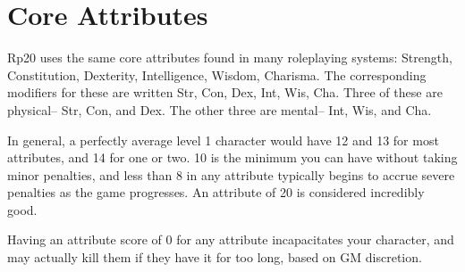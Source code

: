 \section{Core Attributes}
Rp20 uses the same core attributes found in many roleplaying systems: Strength, Constitution, Dexterity, Intelligence, Wisdom, Charisma. The corresponding modifiers for these are written Str, Con, Dex, Int, Wis, Cha. Three of these are physical– Str, Con, and Dex. The other three are mental– Int, Wis, and Cha.

In general, a perfectly average level 1 character would have 12 and 13 for most attributes, and 14 for one or two. 10 is the minimum you can have without taking minor penalties, and less than 8 in any attribute typically begins to accrue severe penalties as the game progresses. An attribute of 20 is considered incredibly good.

Having an attribute score of 0 for any attribute incapacitates your character, and may actually kill them if they have it for too long, based on GM discretion.

